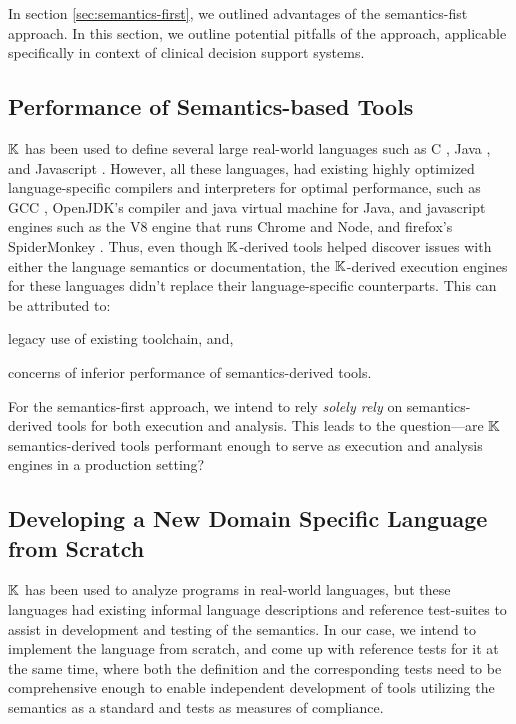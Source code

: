 In section \autoref{sec:semantics-first}, we outlined advantages of the
semantics-fist approach.
In this section, we outline potential pitfalls of the
approach, applicable specifically in context of clinical decision support
systems.

\subsection{Performance of Semantics-based Tools}

$\mathbb{K}$ has been used to define several large real-world languages such as C
\cite{HathhornPLDI15}, Java \cite{BogdanasPOPL15}, and Javascript
\cite{ParkPLDI15}. However, all these languages, had existing
highly optimized language-specific compilers and interpreters
for optimal performance, such as GCC \cite{GCCUrl}, OpenJDK's compiler and java
virtual machine for Java, and javascript engines such as the V8 engine
\cite{V8Url} that runs Chrome and Node, and firefox's SpiderMonkey
\cite{SpiderMonkeyUrl}. Thus, even though $\mathbb{K}$-derived tools helped
discover issues with either the language semantics or documentation,
the $\mathbb{K}$-derived execution engines for these languages didn't
replace their language-specific counterparts. This can be attributed to:
\begin{enumerate*}[label=(\roman*)]
  \item legacy use of existing toolchain, and,
  \item concerns of inferior performance of semantics-derived tools.
\end{enumerate*}

For the semantics-first approach, we intend to rely \emph{solely rely} on
semantics-derived tools for both execution and analysis. This leads to the
question---are $\mathbb{K}$ semantics-derived tools performant enough to serve as
execution and analysis engines in a production setting?

\subsection{Developing a New Domain Specific Language from Scratch}

$\mathbb{K}{}$ has been used to analyze programs in real-world languages, but
these languages had existing informal language descriptions
and reference test-suites to assist in development and testing of
the semantics. In our case,
we intend to implement the language from scratch, and come up with reference tests
for it at the same time, where both the definition and the corresponding tests
need to be comprehensive enough to enable independent development of tools utilizing
the semantics as a standard and tests as measures of compliance.

